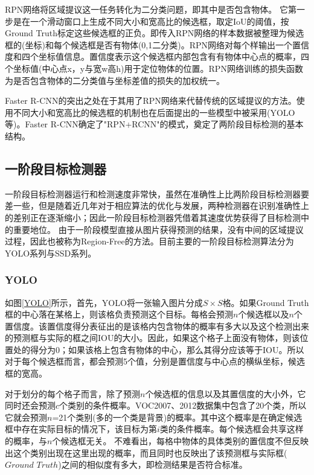 RPN网络将区域提议这一任务转化为二分类问题，即其中是否包含物体。
它第一步是在一个滑动窗口上生成不同大小和宽高比的候选框，取定IoU的阈值，按Ground Truth标定这些候选框的正负。即传入RPN网络的样本数据被整理为候选框的(坐标)和每个候选框是否有物体(0,1二分类)。RPN网络对每个样输出一个置信度和四个坐标值信息。置信度表示这个候选框内部包含有有物体中心点的概率，四个坐标值(中心点x，y与宽w高h)用于定位物体的位置。RPN网络训练的损失函数为是否包含物体的二分类值与坐标差值的损失的加权统一。

Faster R-CNN的突出之处在于其用了RPN网络来代替传统的区域提议的方法。使用不同大小和宽高比的候选框的机制也在后面提出的一些模型中被采用(YOLO\cite{YOLO}等)。Faster R-CNN确定了"RPN+RCNN"的模式，奠定了两阶段目标检测的基本结构。

\subsection{一阶段目标检测器}
一阶段目标检测器运行和检测速度非常快，虽然在准确性上比两阶段目标检测器要差一些，但是随着近几年对于相应算法的优化与发展，两种检测器在识别准确性上的差别正在逐渐缩小；因此一阶段目标检测器凭借着其速度优势获得了目标检测中的重要地位。
由于一阶段模型直接从图片获得预测的结果，没有中间的区域提议过程，因此也被称为Region-Free的方法。目前主要的一阶段目标检测算法分为YOLO\cite{YOLO}系列与SSD\cite{SSD}系列。

\subsubsection{YOLO}

如图\ref{YOLO}所示，首先，YOLO\cite{YOLO}将一张输入图片分成$S\times S$格。如果Ground Truth框的中心落在某格上，则该格负责预测这个目标。每格会预测$n$个候选框以及$n$个置信度。该置信度得分表征出的是该格内包含物体的概率有多大以及这个检测出来的预测框与实际的框之间IOU的大小。因此，如果这个格子上面没有物体，则该位置处的得分为0；如果该格上包含有物体的中心，那么其得分应该等于IOU。所以对于每个候选框而言，都会预测5个值，分别是置信度与中心点的横纵坐标，候选框的宽高。

对于划分的每个格子而言，除了预测$n$个候选框的信息以及其置信度的大小外，它同时还会预测$c$个类别的条件概率。VOC2007、2012数据集中包含了20个类，所以它就会预测$n$=21个类别(多的一个类是背景)的概率。其中这个概率是在确定候选框中存在实际目标的情况下，该目标为第$i$类的条件概率。每个候选框会共享这样的概率，与$n$个候选框无关。
不难看出，每格中物体的具体类别的置信度不但反映出这个类别出现在这里出现的概率，而且同时也反映出了该预测框与实际框($Ground$ $Truth$)之间的相似度有多大，即检测结果是否符合标准。

